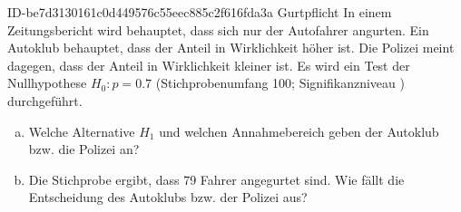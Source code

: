 \begin{exercise}
      {ID-be7d3130161c0d449576c55eec885c2f616fda3a}
      {Gurtpflicht}
  \ifproblem\problem
    In einem Zeitungsbericht wird behauptet, dass sich nur  der
    Autofahrer angurten. Ein Autoklub behauptet, dass der Anteil in Wirklichkeit
    höher ist. Die Polizei meint dagegen, dass der Anteil in Wirklichkeit
    kleiner ist. Es wird ein Test der Nullhypothese $H_0:p=\num{0.7}$
    (Stichprobenumfang 100; Signifikanzniveau ) durchgeführt.
    \begin{enumerate}[a)]
      \item Welche Alternative $H_1$ und welchen Annahmebereich geben der
            Autoklub bzw. die Polizei an?
      \item Die Stichprobe ergibt, dass 79 Fahrer angegurtet sind. Wie fällt
            die Entscheidung des Autoklubs bzw. der Polizei aus?
    \end{enumerate}
  \fi
\end{exercise}
